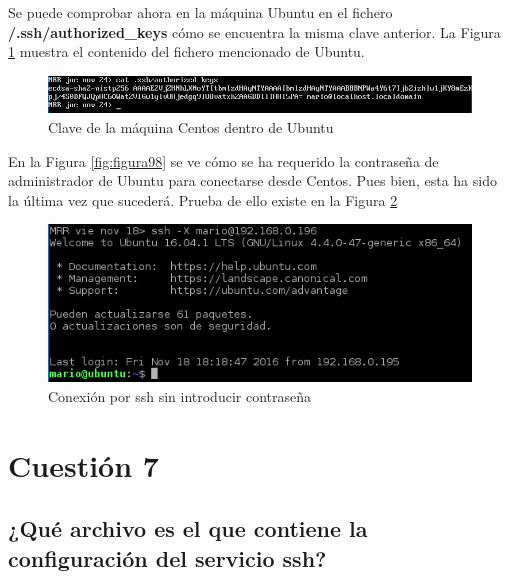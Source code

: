 Se puede comprobar ahora en la máquina Ubuntu en el fichero \textbf{\AC/.ssh/authorized\_keys} cómo se encuentra la misma clave anterior. La Figura \ref{fig:figura100} muestra el contenido del fichero mencionado de Ubuntu.

\begin{figure}[H] %
	\centering
	\includegraphics[scale=0.7]{figuras/figura100.png} 
	\caption{Clave de la máquina Centos dentro de Ubuntu} 
	\label{fig:figura100}
\end{figure}

\newpage

En la Figura \ref{fig:figura98} se ve cómo se ha requerido la contraseña de administrador de Ubuntu para conectarse desde Centos. Pues bien, esta ha sido la última vez que sucederá.
Prueba de ello existe en la Figura \ref{fig:figura101}

\begin{figure}[H] %
	\centering
	\includegraphics[scale=0.8]{figuras/figura20.png} 
	\caption{Conexión por ssh sin introducir contraseña} 
	\label{fig:figura101}
\end{figure}


\newpage

\section{Cuestión 7}
\subsection{¿Qué archivo es el que contiene la configuración del servicio
	ssh?}

